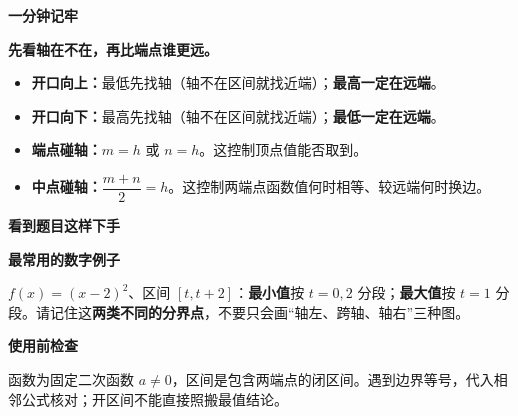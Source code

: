 \begin{summarybox}
\textbf{\textcolor{CSummary}{一分钟记牢}}

\textbf{\Large 先看轴在不在，再比端点谁更远。}

\begin{itemize}[leftmargin=*,itemsep=0.33em]
 \item \textbf{开口向上：}最低先找轴（轴不在区间就找近端）；\textbf{最高一定在远端}。
 \item \textbf{开口向下：}最高先找轴（轴不在区间就找近端）；\textbf{最低一定在远端}。
 \item \textbf{端点碰轴：}$m=h$ 或 $n=h$。这控制顶点值能否取到。
 \item \textbf{中点碰轴：}$\dfrac{m+n}{2}=h$。这控制两端点函数值何时相等、较远端何时换边。
\end{itemize}

\textbf{\textcolor{CSummary}{看到题目这样下手}}

\begin{center}

\end{center}

\textbf{\textcolor{CSummary}{最常用的数字例子}}

$f(x)=(x-2)^2$、区间 $[t,t+2]$：\textbf{最小值}按 $t=0,2$ 分段；\textbf{最大值}按 $t=1$ 分段。请记住这\textbf{两类不同的分界点}，不要只会画“轴左、跨轴、轴右”三种图。

\textbf{\textcolor{CSummary}{使用前检查}}

函数为固定二次函数 $a\neq0$，区间是包含两端点的闭区间。遇到边界等号，代入相邻公式核对；开区间不能直接照搬最值结论。
\end{summarybox}
